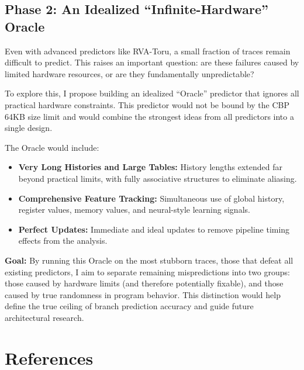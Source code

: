 \documentclass[11pt,a4paper]{article}
\begin{document}
\subsection{Phase 2: An Idealized “Infinite-Hardware” Oracle}

Even with advanced predictors like RVA-Toru, a small fraction of traces remain difficult to predict. This raises an important question: are these failures caused by limited hardware resources, or are they fundamentally unpredictable?

To explore this, I propose building an idealized “Oracle” predictor that ignores all practical hardware constraints. This predictor would not be bound by the CBP 64KB size limit and would combine the strongest ideas from all predictors into a single design.

The Oracle would include:
\begin{itemize}
    \item \textbf{Very Long Histories and Large Tables:} History lengths extended far beyond practical limits, with fully associative structures to eliminate aliasing.
    \item \textbf{Comprehensive Feature Tracking:} Simultaneous use of global history, register values, memory values, and neural-style learning signals.
    \item \textbf{Perfect Updates:} Immediate and ideal updates to remove pipeline timing effects from the analysis.
\end{itemize}

\textbf{Goal:} By running this Oracle on the most stubborn traces, those that defeat all existing predictors, I aim to separate remaining mispredictions into two groups: those caused by hardware limits (and therefore potentially fixable), and those caused by true randomness in program behavior. This distinction would help define the true ceiling of branch prediction accuracy and guide future architectural research.

\newpage

\section{References}
\end{document}
